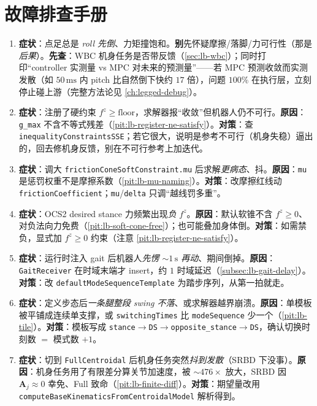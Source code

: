 \section*{故障排查手册}
\begin{enumerate}
  \item \textbf{症状}：点足总是 \emph{roll 先倒}、力矩撞饱和。\textbf{别}先怀疑摩擦/落脚/力可行性（那是\emph{后果}）。\textbf{先查}：WBC 机身任务是否带反馈（\cref{sec:lb-wbc}）；同时打印“controller 实测量 vs MPC 对未来的预测量”——若 MPC 预测收敛而实测发散（如 $50\,\mathrm{ms}$ 内 pitch 比自然倒下快约 $17$ 倍），问题 $100\%$ 在执行层，立刻停止碰上游（完整方法论见 \cref{ch:legged-debug}）。
  \item \textbf{症状}：注册了硬约束 $f^z\ge\text{floor}$，求解器报“收敛”但机器人仍不可行。\textbf{原因}：\texttt{g\_max} 不含不等式残差（\cref{pit:lb-register-ne-satisfy}）。\textbf{对策}：查 \texttt{inequalityConstraintsSSE}；若它很大，说明是参考不可行（机身失稳）逼出的，回去修机身反馈，别在不可行参考上加迭代。
  \item \textbf{症状}：调大 \texttt{frictionConeSoftConstraint.mu} 后求解\emph{更病态}、抖。\textbf{原因}：\texttt{mu} 是惩罚权重不是摩擦系数（\cref{pit:lb-mu-naming}）。\textbf{对策}：改摩擦红线动 \texttt{frictionCoefficient}；\texttt{mu}/\texttt{delta} 只调“越线罚多重”。
  \item \textbf{症状}：OCS2 desired stance 力频繁出现\emph{负} $f^z$。\textbf{原因}：默认软锥不含 $f^z\ge 0$、对负法向力免费（\cref{pit:lb-soft-cone-free}）；也可能叠加身体倒。\textbf{对策}：如需禁负，显式加 $f^z\ge 0$ 约束（注意 \cref{pit:lb-register-ne-satisfy}）。
  \item \textbf{症状}：运行时注入 gait 后机器人\emph{先愣 $\sim 1\,\mathrm{s}$ 再动}、期间倒掉。\textbf{原因}：\texttt{GaitReceiver} 在时域末端才 insert，约 $1$ 时域延迟（\cref{subsec:lb-gait-delay}）。\textbf{对策}：改 \texttt{defaultModeSequenceTemplate} 为踏步序列，从第一拍就走。
  \item \textbf{症状}：定义步态后\emph{一条腿整段 swing 不落}、或求解器越界崩溃。\textbf{原因}：单模板被平铺成连续单支撑，或 \texttt{switchingTimes} 比 \texttt{modeSequence} 少一个（\cref{pit:lb-tile}）。\textbf{对策}：模板写成 \texttt{stance$\to$DS$\to$opposite\_stance$\to$DS}，确认切换时刻数 $=$ 模式数 $+1$。
  \item \textbf{症状}：切到 \texttt{FullCentroidal} 后机身任务突然\emph{抖到发散}（SRBD 下没事）。\textbf{原因}：机身任务用了有限差分算关节加速度，被 $\sim 476\times$ 放大，SRBD 因 $\mathbf A_j\approx 0$ 幸免、Full 致命（\cref{pit:lb-finite-diff}）。\textbf{对策}：期望量改用 \texttt{computeBaseKinematicsFromCentroidalModel} 解析得到。
\end{enumerate}
